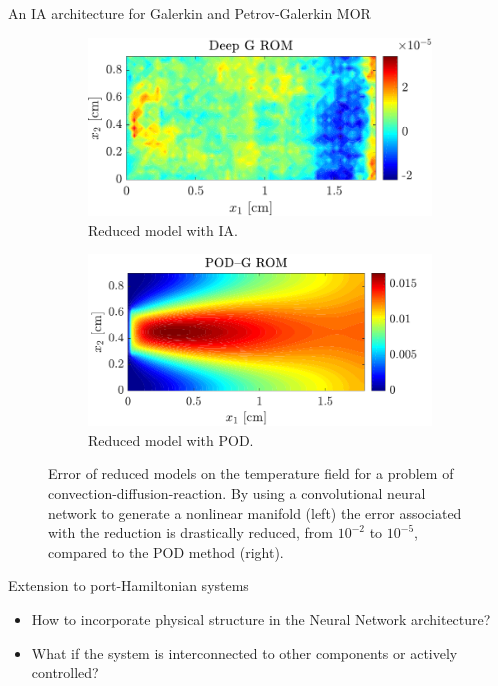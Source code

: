 \documentclass{beamer}
\begin{document}
\begin{frame}{An IA architecture for Galerkin and Petrov-Galerkin MOR}
	\begin{figure}[t]
		\begin{subfigure}[t]{0.465\textwidth}
			\includegraphics[width=\columnwidth]{DGROM_T_param1.pdf} 
			\caption{Reduced model with IA.}
		\end{subfigure}\hfill
		\begin{subfigure}[t]{0.48\textwidth}
			\includegraphics[width=\columnwidth]{GROM_T_param1.pdf}%
			\caption{Reduced model with POD.}
		\end{subfigure}
		\caption[]{Error of reduced models on the temperature field for a problem of convection-diffusion-reaction. By using a convolutional neural network to generate a nonlinear manifold (left) the error associated with the reduction is drastically reduced, from $10^{-2}$ to $10^{-5}$, compared to the POD method (right).}%
	\end{figure}
\end{frame}

\begin{frame}{Extension to port-Hamiltonian systems}
	\begin{itemize}
		\item How to incorporate physical structure in the Neural Network architecture?
		\item What if the system is interconnected to other components or actively controlled?
	\end{itemize}
\end{frame}
\end{document}
